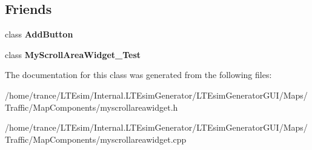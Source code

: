 \subsection*{Friends}
\begin{DoxyCompactItemize}
\item 
class {\bfseries Add\+Button}\hypertarget{class_my_scroll_area_widget_a236bf1ac9377de5ca1d049a8bd0afd47}{}\label{class_my_scroll_area_widget_a236bf1ac9377de5ca1d049a8bd0afd47}

\item 
class {\bfseries My\+Scroll\+Area\+Widget\+\_\+\+Test}\hypertarget{class_my_scroll_area_widget_a35c2ea0fbb376c81fd4e53a1d5ed8680}{}\label{class_my_scroll_area_widget_a35c2ea0fbb376c81fd4e53a1d5ed8680}

\end{DoxyCompactItemize}


The documentation for this class was generated from the following files\+:\begin{DoxyCompactItemize}
\item 
/home/trance/\+L\+T\+Esim/\+Internal.\+L\+T\+Esim\+Generator/\+L\+T\+Esim\+Generator\+G\+U\+I/\+Maps/\+Traffic/\+Map\+Components/myscrollareawidget.\+h\item 
/home/trance/\+L\+T\+Esim/\+Internal.\+L\+T\+Esim\+Generator/\+L\+T\+Esim\+Generator\+G\+U\+I/\+Maps/\+Traffic/\+Map\+Components/myscrollareawidget.\+cpp\end{DoxyCompactItemize}
